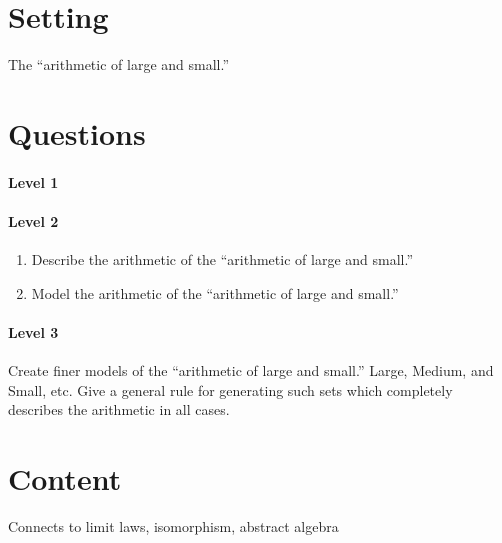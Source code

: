 \documentclass{ximera}
\begin{document}
\section{Setting}

The ``arithmetic of large and small.''


\section{Questions}

\paragraph{Level 1}

\paragraph{Level 2}

\begin{enumerate}
\item Describe the arithmetic of the ``arithmetic of large and small.''
\item Model the arithmetic of the ``arithmetic of large and small.''
\end{enumerate}

\paragraph{Level 3}
\item Create finer models of the ``arithmetic of large and small.''
  Large, Medium, and Small, etc. Give a general rule for generating
  such sets which completely describes the arithmetic in all cases. 


  \section{Content}

  Connects to limit laws, isomorphism, abstract algebra
\end{document}
